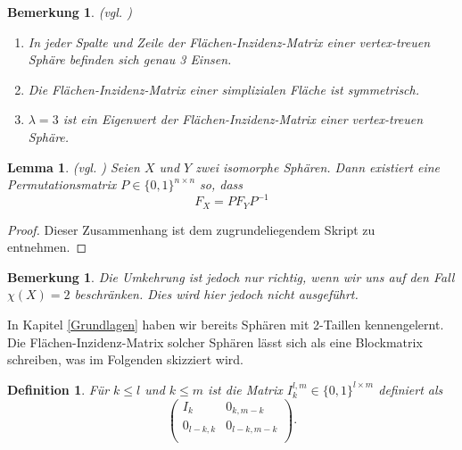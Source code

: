 \documentclass[12pt,titlepage,twoside,cleardoublepage]{article}
\theoremstyle{nummermitklammern}
\newtheorem{lemma}[temp]{Lemma}
\newtheorem{definition}[temp]{Definition}
\newtheorem{bemerkung}[temp]{Bemerkung}
\newtheorem{definition}[zahl]{Definition}
\newtheorem{lemma}[zahl]{Lemma}
\newtheorem{bemerkung}[zahl]{Bemerkung}
\numberwithin{equation}{section}
\begin{document}
\begin{bemerkung}{\textsc{(}vgl. \textsc{\cite{simp})}}
\begin{enumerate}
\item In jeder Spalte und Zeile der Flächen-Inzidenz-Matrix einer vertex-treuen Sphäre befinden sich genau 3 Einsen. 
\item Die Flächen-Inzidenz-Matrix einer simplizialen Fläche  ist symmetrisch.
\item $\lambda =3$ ist ein Eigenwert der Flächen-Inzidenz-Matrix einer vertex-treuen Sphäre. 
\end{enumerate}
\end{bemerkung}
\begin{lemma}{\textsc{(}vgl. \textsc{\cite{simp})}}
Seien $X$ und $Y$ zwei isomorphe Sphären. Dann existiert eine Permutationsmatrix $P\in \{0,1\}^{n \times n}$ so, dass 
\[
F_X=PF_YP^{-1}
\] 
\end{lemma}
\begin{proof}
Dieser Zusammenhang ist dem zugrundeliegendem Skript zu entnehmen.
\end{proof}

\begin{bemerkung}
Die Umkehrung ist jedoch nur richtig, wenn wir uns auf den Fall $\chi(X)=2$ beschränken.  Dies wird hier jedoch nicht ausgeführt. 
\end{bemerkung}
In Kapitel \ref{Grundlagen} haben wir bereits Sphären mit 2-Taillen kennengelernt. Die Flächen-Inzidenz-Matrix solcher Sphären lässt sich als eine Blockmatrix schreiben, was im Folgenden skizziert wird.
\begin{definition}
Für $k\leq l$ und $k\leq m$ ist die Matrix $I^{l,m}_k\in \{0,1\}^{l \times m}$ definiert als
\[
\left( 
\begin{array}{cccc} 
  I_k & 0_{k,m-k} \\
  0_{l-k,k} & 0_{l-k,m-k}\\
\end{array} 
\right).
\]
\end{definition}
\end{document}
